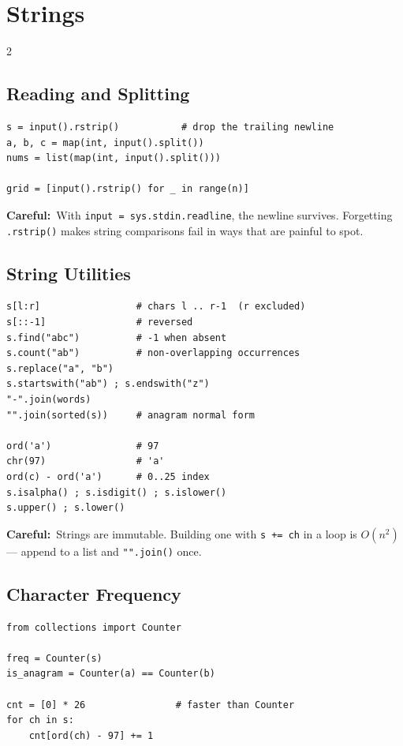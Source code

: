 \documentclass[10pt]{article}
\newcommand{\code}[1]{\texttt{\small #1}}
\newcommand{\warn}[1]{{\color{warnc}\footnotesize\textbf{Careful:}}~{\footnotesize #1}\par}
\begin{document}
\section{Strings}
\begin{multicols}{2}

\subsection{Reading and Splitting}
\begin{lstlisting}
s = input().rstrip()           # drop the trailing newline
a, b, c = map(int, input().split())
nums = list(map(int, input().split()))

grid = [input().rstrip() for _ in range(n)]
\end{lstlisting}
\warn{With \code{input = sys.stdin.readline}, the newline survives.
Forgetting \code{.rstrip()} makes string comparisons fail in ways that
are painful to spot.}

\subsection{String Utilities}
\begin{lstlisting}
s[l:r]                 # chars l .. r-1  (r excluded)
s[::-1]                # reversed
s.find("abc")          # -1 when absent
s.count("ab")          # non-overlapping occurrences
s.replace("a", "b")
s.startswith("ab") ; s.endswith("z")
"-".join(words)
"".join(sorted(s))     # anagram normal form

ord('a')               # 97
chr(97)                # 'a'
ord(c) - ord('a')      # 0..25 index
s.isalpha() ; s.isdigit() ; s.islower()
s.upper() ; s.lower()
\end{lstlisting}
\warn{Strings are immutable. Building one with \code{s += ch} in a loop
is $O(n^2)$ --- append to a list and \code{"".join()} once.}

\subsection{Character Frequency}
\begin{lstlisting}
from collections import Counter

freq = Counter(s)
is_anagram = Counter(a) == Counter(b)

cnt = [0] * 26                # faster than Counter
for ch in s:
    cnt[ord(ch) - 97] += 1
\end{lstlisting}


\end{multicols}
\end{document}
